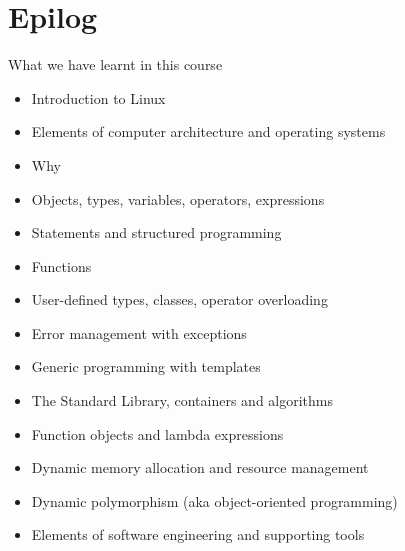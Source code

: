 

\section*{Epilog}

\begin{frame}{What we have learnt in this course}
  \begin{itemize}
  \item Introduction to Linux
  \item Elements of computer architecture and operating systems
  \item Why \Cpp{}
  \item Objects, types, variables, operators, expressions
  \item Statements and structured programming
  \item Functions
  \item User-defined types, classes, operator overloading
  \item Error management with exceptions
  \item Generic programming with templates
  \item The Standard Library, containers and algorithms
  \item Function objects and lambda expressions
  \item Dynamic memory allocation and resource management
  \item Dynamic polymorphism (aka object-oriented programming)
  \item Elements of software engineering and supporting tools
  \end{itemize}
\end{frame}

